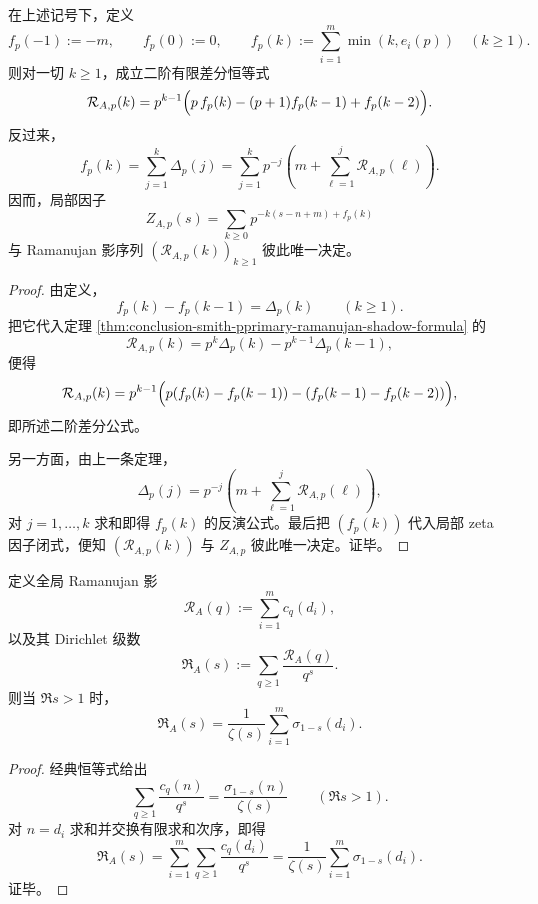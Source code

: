 \begin{theorem}\label{thm:conclusion-smith-local-zeta-ramanujan-shadow-difference-equivalence}
在上述记号下，定义
\[
f_p(-1):=-m,
\qquad
f_p(0):=0,
\qquad
f_p(k):=\sum_{i=1}^{m}\min(k,e_i(p))
\quad (k\ge 1).
\]
则对一切 \(k\ge 1\)，成立二阶有限差分恒等式
\[
\mathcal R_{A,p}(k)
=
p^{k-1}\Bigl(
p\,f_p(k)-(p+1)f_p(k-1)+f_p(k-2)
\Bigr).
\]
反过来，
\[
f_p(k)
=
\sum_{j=1}^{k}\Delta_p(j)
=
\sum_{j=1}^{k} p^{-j}\left(m+\sum_{\ell=1}^{j}\mathcal R_{A,p}(\ell)\right).
\]
因而，局部因子
\[
Z_{A,p}(s)=\sum_{k\ge 0}p^{-k(s-n+m)+f_p(k)}
\]
与 Ramanujan 影序列 \((\mathcal R_{A,p}(k))_{k\ge 1}\) 彼此唯一决定。
\end{theorem}
\begin{proof}
由定义，
\[
f_p(k)-f_p(k-1)=\Delta_p(k)
\qquad (k\ge 1).
\]
把它代入定理 \ref{thm:conclusion-smith-pprimary-ramanujan-shadow-formula} 的
\[
\mathcal R_{A,p}(k)=p^k\Delta_p(k)-p^{k-1}\Delta_p(k-1),
\]
便得
\[
\mathcal R_{A,p}(k)
=
p^{k-1}\Bigl(
p(f_p(k)-f_p(k-1))-(f_p(k-1)-f_p(k-2))
\Bigr),
\]
即所述二阶差分公式。

另一方面，由上一条定理，
\[
\Delta_p(j)=p^{-j}\left(m+\sum_{\ell=1}^{j}\mathcal R_{A,p}(\ell)\right),
\]
对 \(j=1,\dots,k\) 求和即得 \(f_p(k)\) 的反演公式。最后把 \((f_p(k))\) 代入局部 zeta 因子闭式，便知 \((\mathcal R_{A,p}(k))\) 与 \(Z_{A,p}\) 彼此唯一决定。证毕。
\end{proof}

\begin{proposition}\label{prop:conclusion-smith-global-ramanujan-dirichlet-shadow}
定义全局 Ramanujan 影
\[
\mathcal R_A(q):=\sum_{i=1}^{m}c_q(d_i),
\]
以及其 Dirichlet 级数
\[
\mathfrak R_A(s):=\sum_{q\ge 1}\frac{\mathcal R_A(q)}{q^s}.
\]
则当 \(\Re s>1\) 时，
\[
\mathfrak R_A(s)=\frac{1}{\zeta(s)}\sum_{i=1}^{m}\sigma_{1-s}(d_i).
\]
\end{proposition}
\begin{proof}
经典恒等式给出
\[
\sum_{q\ge 1}\frac{c_q(n)}{q^s}=\frac{\sigma_{1-s}(n)}{\zeta(s)}
\qquad (\Re s>1).
\]
对 \(n=d_i\) 求和并交换有限求和次序，即得
\[
\mathfrak R_A(s)
=
\sum_{i=1}^{m}\sum_{q\ge 1}\frac{c_q(d_i)}{q^s}
=
\frac{1}{\zeta(s)}\sum_{i=1}^{m}\sigma_{1-s}(d_i).
\]
证毕。
\end{proof}

